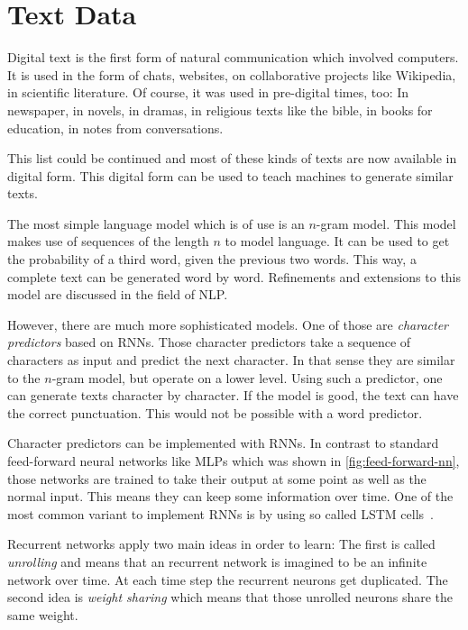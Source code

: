 
\section{Text Data}%
\label{sec:text-generation}%

Digital text is the first form of natural communication which involved
computers. It is used in the form of chats, websites, on collaborative projects
like Wikipedia, in scientific literature. Of course, it was used in pre-digital
times, too: In newspaper, in novels, in dramas, in religious texts like the
bible, in books for education, in notes from conversations.

This list could be continued and most of these kinds of texts are now available
in digital form. This digital form can be used to teach machines to generate
similar texts.

The most simple language model which is of use is an $n$-gram model. This model
makes use of sequences of the length $n$ to model language. It can be used to
get the probability of a third word, given the previous two words. This way, a
complete text can be generated word by word. Refinements and extensions to this
model are discussed in the field of \gls{NLP}.

However, there are much more sophisticated models. One of those are
\textit{character predictors} based on \glspl{RNN}. Those character predictors
take a sequence of characters as input and predict the next character. In that
sense they are similar to the $n$-gram model, but operate on a lower level.
Using such a predictor, one can generate texts character by character. If the
model is good, the text can have the correct punctuation. This would not be
possible with a word predictor.

Character predictors can be implemented with \glspl{RNN}. In contrast to
standard feed-forward neural networks like \glspl{MLP} which was shown in
\cref{fig:feed-forward-nn}, those networks are trained to take their output at
some point as well as the normal input. This means they can keep some
information over time. One of the most common variant to implement \glspl{RNN}
is by using so called \gls{LSTM} cells~\cite{hochreiter1997long}.

Recurrent networks apply two main ideas in order to learn: The first is called
\textit{unrolling} and means that an recurrent network is imagined to be
an infinite network over time. At each time step the recurrent neurons get
duplicated. The second idea is \textit{weight sharing} which means that those
unrolled neurons share the same weight.


